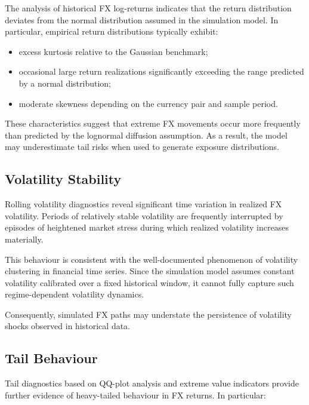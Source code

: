 The analysis of historical FX log-returns indicates that the return distribution deviates from the normal distribution assumed in the simulation model. In particular, empirical return distributions typically exhibit:

\begin{itemize}
	
	\item excess kurtosis relative to the Gaussian benchmark;
	
	\item occasional large return realizations significantly exceeding the range predicted by a normal distribution;
	
	\item moderate skewness depending on the currency pair and sample period.
	
\end{itemize}

These characteristics suggest that extreme FX movements occur more frequently than predicted by the lognormal diffusion assumption. As a result, the model may underestimate tail risks when used to generate exposure distributions.

\subsection{Volatility Stability}

Rolling volatility diagnostics reveal significant time variation in realized FX volatility. Periods of relatively stable volatility are frequently interrupted by episodes of heightened market stress during which realized volatility increases materially.

This behaviour is consistent with the well-documented phenomenon of volatility clustering in financial time series. Since the simulation model assumes constant volatility calibrated over a fixed historical window, it cannot fully capture such regime-dependent volatility dynamics.

Consequently, simulated FX paths may understate the persistence of volatility shocks observed in historical data.

\subsection{Tail Behaviour}

Tail diagnostics based on QQ-plot analysis and extreme value indicators provide further evidence of heavy-tailed behaviour in FX returns. In particular:

